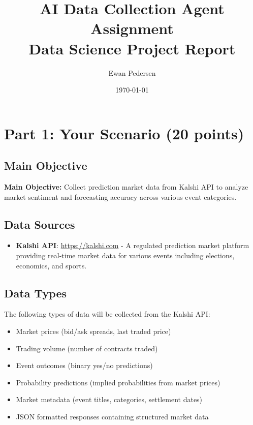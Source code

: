 \documentclass[12pt,a4paper]{article}
\title{\textbf{AI Data Collection Agent Assignment}\\ Data Science Project Report}
\author{Ewan Pedersen}
\date{\today}
\begin{document}
\maketitle
\thispagestyle{empty}
\newpage

\tableofcontents
\newpage
\section{Part 1: Your Scenario (20 points)}

\subsection{Main Objective}

\textbf{Main Objective:} Collect prediction market data from Kalshi API to analyze market sentiment and forecasting accuracy across various event categories.

\subsection{Data Sources}

\begin{itemize}
  \item \textbf{Kalshi API}: \url{https://kalshi.com} - A regulated prediction market platform providing real-time market data for various events including elections, economics, and sports.
\end{itemize}

\subsection{Data Types}

The following types of data will be collected from the Kalshi API:

\begin{itemize}
  \item Market prices (bid/ask spreads, last traded price)
  \item Trading volume (number of contracts traded)
  \item Event outcomes (binary yes/no predictions)
  \item Probability predictions (implied probabilities from market prices)
  \item Market metadata (event titles, categories, settlement dates)
  \item JSON formatted responses containing structured market data
\end{itemize}
\end{document}

